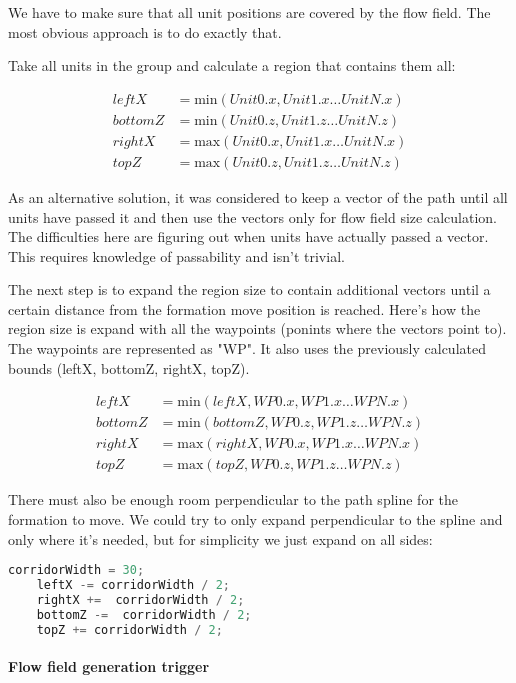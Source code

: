 \documentclass[a4paper,10pt]{article}
\begin{document}
We have to make sure that all unit positions are covered by the flow field.
The most obvious approach is to do exactly that. 

Take all units in the group and calculate a region that contains them all:

\begin{align*}
  leftX &= \text{min}(Unit0.x, Unit1.x \dots UnitN.x)\\
bottomZ &= \text{min}(Unit0.z, Unit1.z \dots UnitN.z)\\
 rightX &= \text{max}(Unit0.x, Unit1.x \dots UnitN.x)\\
   topZ &= \text{max}(Unit0.z, Unit1.z \dots UnitN.z)
\end{align*}

As an alternative solution, it was considered to keep a vector of the path until all units have passed it and then use the vectors only for flow field size calculation.
The difficulties here are figuring out when units have actually passed a vector.
This requires knowledge of passability and isn't trivial.

The next step is to expand the region size to contain additional vectors until a certain distance from the formation move position is reached.
Here's how the region size is expand with all the waypoints (ponints where the vectors point to).
The waypoints are represented as "WP".
It also uses the previously calculated bounds (leftX, bottomZ, rightX, topZ).

\begin{align*}
  leftX &= \text{min}(leftX, WP0.x, WP1.x \dots WPN.x)\\
bottomZ &= \text{min}(bottomZ, WP0.z, WP1.z \dots WPN.z)\\
 rightX &= \text{max}(rightX, WP0.x, WP1.x \dots WPN.x)\\
   topZ &= \text{max}(topZ, WP0.z, WP1.z \dots WPN.z)
\end{align*}

There must also be enough room perpendicular to the path spline for the formation to move.
We could try to only expand perpendicular to the spline and only where it's needed, but for simplicity we just expand on all sides:

\begin{lstlisting}[language=C++]
	corridorWidth = 30;
	leftX -= corridorWidth / 2;
	rightX +=  corridorWidth / 2;
	bottomZ -=  corridorWidth / 2;
	topZ += corridorWidth / 2;
\end{lstlisting}


\paragraph{Flow field generation trigger} ~\\
\end{document}
